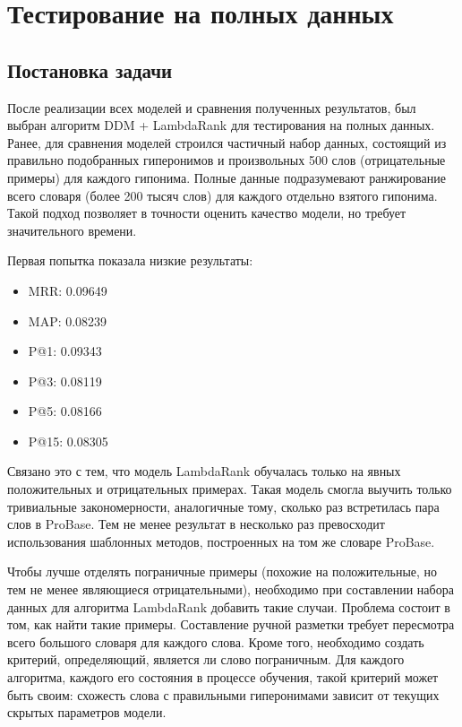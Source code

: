 \section{Тестирование на полных данных}
\label{sec:Chapter_5} 
\large

\subsection{Постановка задачи}

После реализации всех моделей и сравнения полученных результатов, был выбран алгоритм DDM + LambdaRank для тестирования на полных данных. Ранее, для сравнения моделей строился частичный набор данных, состоящий из правильно подобранных гиперонимов и произвольных 500 слов (отрицательные примеры) для каждого гипонима. Полные данные подразумевают ранжирование всего словаря (более 200 тысяч слов) для каждого отдельно взятого гипонима. Такой подход позволяет в точности оценить качество модели, но требует значительного времени. 

Первая попытка показала низкие результаты:
\begin{itemize}
\item MRR: 0.09649
\item MAP: 0.08239
\item P@1: 0.09343
\item P@3: 0.08119
\item P@5: 0.08166
\item P@15: 0.08305
\end{itemize}

Связано это с тем, что модель LambdaRank обучалась только на явных положительных и отрицательных примерах. Такая модель смогла выучить только тривиальные закономерности, аналогичные тому, сколько раз встретилась пара слов в ProBase. Тем не менее результат в несколько раз превосходит использования шаблонных методов, построенных на том же словаре ProBase. 

Чтобы лучше отделять пограничные примеры (похожие на положительные, но тем не менее являющиеся отрицательными), необходимо при составлении набора данных для алгоритма LambdaRank добавить такие случаи. Проблема состоит в том, как найти такие примеры. Составление ручной разметки требует пересмотра всего большого словаря для каждого слова. Кроме того, необходимо создать критерий, определяющий, является ли слово пограничным. Для каждого алгоритма, каждого его состояния в процессе обучения, такой критерий может быть своим: схожесть слова с правильными гиперонимами зависит от текущих скрытых параметров модели. 

